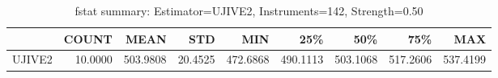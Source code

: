 \begin{table}[ht]
\centering
\caption{fstat summary: Estimator=UJIVE2, Instruments=142, Strength=0.50}
\begin{tabular}{lrrrrrrrr}
\toprule
 & COUNT & MEAN & STD & MIN & 25\% & 50\% & 75\% & MAX \\
\midrule
UJIVE2 & 10.0000 & 503.9808 & 20.4525 & 472.6868 & 490.1113 & 503.1068 & 517.2606 & 537.4199 \\
\bottomrule
\end{tabular}
\end{table}
